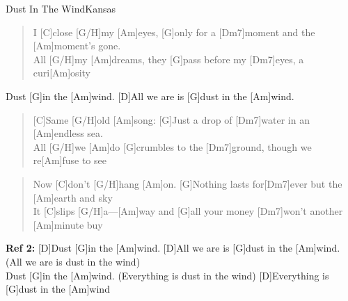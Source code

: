 \begin{song}{Dust In The Wind}{Kansas}

    \begin{verse}  
        I [C]close  [G/H]my [Am]eyes, [G]only for a [Dm7]moment and the [Am]moment's gone. \\
        [C]All [G/H]my [Am]dreams, they [G]pass before my [Dm7]eyes, a curi[Am]osity
    \end{verse}  

    \begin{chorus}
        [D]Dust [G]in the [Am]wind. [D]All we are is [G]dust in the [Am]wind.
    \end{chorus}

    \begin{verse}  
        [C]Same [G/H]old [Am]song: [G]Just a drop of [Dm7]water in an [Am]endless sea. \\
        [C]All [G/H]we [Am]do [G]crumbles to the [Dm7]ground, though we re[Am]fuse to see
    \end{verse}  


    \begin{verse}  
        Now [C]don't [G/H]hang [Am]on. [G]Nothing lasts for[Dm7]ever but the [Am]earth and sky \\
        It [C]slips [G/H]a---[Am]way and [G]all your money [Dm7]won't another [Am]minute buy
    \end{verse}  

    \begin{chorus}  
        \textbf{Ref 2:} [D]Dust [G]in the [Am]wind. [D]All we are is [G]dust in the [Am]wind. (All we are is dust in the wind)  \\  
        [D]Dust [G]in the [Am]wind. (Everything is dust in the wind) [D]Everything is [G]dust in the [Am]wind
    \end{chorus}  

\end{song}
